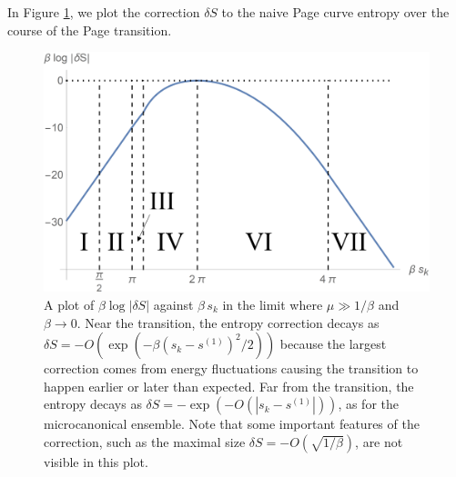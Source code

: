 \documentclass[11pt]{article}
\newcommand{\smax}{s_k}
\numberwithin{equation}{section}
\begin{document}
In Figure \ref{fig:deltaS}, we plot the correction $\delta S$ to the naive Page curve entropy over the course of the Page transition.
\begin{figure}[t]
\includegraphics[width = 0.7\linewidth]{images/EntropyCorrectionsLabelled.png}
\centering
\caption{A plot of $\beta \log |\delta S|$ against $\beta\, \smax$ in the limit where $\mu \gg 1/\beta$ and $\beta \to 0$. Near the transition, the entropy correction decays as $\delta S = -O(\exp(-\beta(\smax - s^{(1)})^2/2))$ because the largest correction comes from energy fluctuations causing the transition to happen earlier or later than expected. Far from the transition, the entropy decays as $\delta S = -\exp(-O(|\smax - s^{(1)}|))$, as for the microcanonical ensemble. Note that some important features of the correction, such as the maximal size $\delta S = -O(\sqrt{1/\beta})$, are not visible in this plot.}
\label{fig:deltaS}
\end{figure} 
\end{document}
